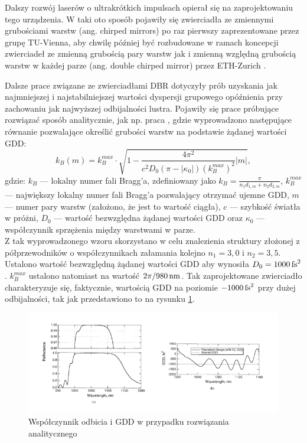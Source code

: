 Dalszy rozwój laserów o ultrakrótkich impulsach opierał się na zaprojektowaniu tego urządzenia. W taki oto sposób pojawiły się zwierciadła ze zmiennymi grubościami warstw (ang. chirped mirrors) po raz pierwszy zaprezentowane przez grupę TU-Vienna, aby chwilę później być rozbudowane w ramach koncepcji zwierciadeł ze zmienną grubością pary warstw jak i zmienną względną grubością warstw w każdej parze (ang. double chirped mirror) przez ETH-Zurich \cite{hist2}.

Dalsze prace związane ze zwierciadłami DBR dotyczyły prób uzyskania jak najmniejszej i najstabilniejszej wartości dyspersji grupowego opóźnienia przy zachowaniu jak najwyższej odbijalności lustra. Pojawiły się prace próbujące rozwiązać sposób analitycznie, jak np. praca \cite{dbr3}, gdzie wyprowadzono następujące równanie pozwalające określić grubości warstw na podstawie żądanej wartości GDD:
\begin{equation}
    k_B(m)=k_B^{max}\cdot\sqrt{1-\frac{4\pi^2}{c^2D_0(\pi-|\kappa_0|)(k_B^{max})^2}|m|},
\end{equation}
gdzie: $k_B$ --- lokalny numer fali Bragg'a, zdefiniowany jako $k_B = \frac{\pi}{n_1d_{1,m}+n_2d_{2,m}}$, $k_B^{max}$ --- największy lokalny numer fali Bragg'a pozwalający otrzymać ujemne GDD, $m$ --- numer pary warstw (założono, że jest to wartość ciągła), $c$ --- szybkość światła w próżni, $D_0$ --- wartość bezwzględna żądanej wartości GDD oraz $\kappa_0$ --- współczynnik sprzężenia między warstwami w parze. \\
Z tak wyprowadzonego wzoru skorzystano w celu znalezienia struktury złożonej z półprzewodników o współczynnikach załamania kolejno $n_1 = 3,0$ i $n_2 = 3,5$. 
Ustalono wartość bezwzględną żądanej wartości GDD aby wynosiła $D_0 = 1000\,\mathrm{fs}^2$. $k_B^{max}$ ustalono natomiast na wartość $2\pi/980\,\mathrm{nm}$. Tak zaprojektowane zwierciadło charakteryzuje się, faktycznie, wartością GDD na poziomie $-1000\,\mathrm{fs}^2$ przy dużej odbijalności, tak jak przedstawiono to na rysunku \ref{fig:anal}.

\begin{figure}[H]
    \centering
    \includegraphics[width=\textwidth]{figures/anal.png}
    \caption[Współczynnik odbicia i GDD w przypadku rozwiązania analitycznego]{Współczynnik odbicia i GDD w przypadku rozwiązania analitycznego \cite{dbr3}}
    \label{fig:anal}
\end{figure}

